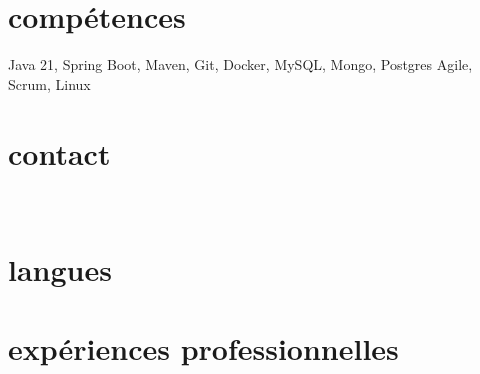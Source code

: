 \documentclass{friggeri-cv} 	%
\begin{document}


\begin{aside} %
\section{compétences}
Java 21, Spring Boot,
Maven, Git, Docker,
MySQL, Mongo, Postgres
Agile, Scrum,
Linux
\section{contact}
\myAddress
~
\myPhoneNumber
\myReferences
\section{langues}
\myLanguages
\end{aside}

\section{expériences professionnelles}
\end{document}
